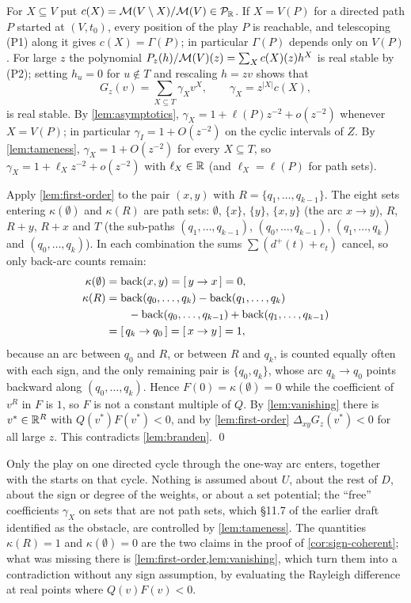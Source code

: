 For $X\subseteq V$ put $c(X)=\mathcal{M}(V\setminus X)/\mathcal{M}(V)\in\mathcal{P}_{\mathbb{R}}$. If $X=V(P)$ for a directed path $P$ started at $(V,t_0)$, every position of the play $P$ is reachable, and telescoping \textup{(P1)} along it gives $c(X)=\Gamma(P)$; in particular $\Gamma(P)$ depends only on $V(P)$. For large $z$ the polynomial $P_z(h)/\mathcal{M}(V)(z)=\sum_Xc(X)(z)h^X$ is real stable by \textup{(P2)}; setting $h_u=0$ for $u\notin T$ and rescaling $h=zv$ shows that
\[
G_z(v)=\sum_{X\subseteq T}\gamma_Xv^X,\qquad \gamma_X=z^{|X|}c(X),
\]
is real stable. By \cref{lem:asymptotics}, $\gamma_X=1+\ell(P)z^{-2}+o(z^{-2})$ whenever $X=V(P)$; in particular $\gamma_I=1+O(z^{-2})$ on the cyclic intervals of $Z$. By \cref{lem:tameness}, $\gamma_X=1+O(z^{-2})$ for every $X\subseteq T$, so $\gamma_X=1+\ell_Xz^{-2}+o(z^{-2})$ with $\ell_X\in\mathbb{R}$ (and $\ell_X=\ell(P)$ for path sets).

Apply \cref{lem:first-order} to the pair $(x,y)$ with $R=\{q_1,\dots,q_{k-1}\}$. The eight sets entering $\kappa(\emptyset)$ and $\kappa(R)$ are path sets: $\emptyset$, $\{x\}$, $\{y\}$, $\{x,y\}$ (the arc $x\to y$), $R$, $R+y$, $R+x$ and $T$ (the sub-paths $(q_1,\dots,q_{k-1})$, $(q_0,\dots,q_{k-1})$, $(q_1,\dots,q_k)$ and $(q_0,\dots,q_k)$). In each combination the sums $\sum(d^{+}(t)+e_t)$ cancel, so only back-arc counts remain:
\begin{align*}
\kappa(\emptyset)&=\operatorname{back}(x,y)=[\,y\to x\,]=0,\\
\kappa(R)&=\operatorname{back}(q_0,\dots,q_k)-\operatorname{back}(q_1,\dots,q_k)\\
&\qquad-\operatorname{back}(q_0,\dots,q_{k-1})+\operatorname{back}(q_1,\dots,q_{k-1})\\
&=[\,q_k\to q_0\,]=[\,x\to y\,]=1,
\end{align*}
because an arc between $q_0$ and $R$, or between $R$ and $q_k$, is counted equally often with each sign, and the only remaining pair is $\{q_0,q_k\}$, whose arc $q_k\to q_0$ points backward along $(q_0,\dots,q_k)$. Hence $F(0)=\kappa(\emptyset)=0$ while the coefficient of $v^R$ in $F$ is $1$, so $F$ is not a constant multiple of $Q$. By \cref{lem:vanishing} there is $v^{*}\in\mathbb{R}^R$ with $Q(v^{*})F(v^{*})<0$, and by \cref{lem:first-order} $\Delta_{xy}G_z(v^{*})<0$ for all large $z$. This contradicts \cref{lem:branden}. \qed

\begin{remark}\label{rem:locality}
Only the play on one directed cycle through the one-way arc enters, together with the starts on that cycle. Nothing is assumed about $U$, about the rest of $D$, about the sign or degree of the weights, or about a set potential; the ``free'' coefficients $\gamma_X$ on sets that are not path sets, which \S11.7 of the earlier draft identified as the obstacle, are controlled by \cref{lem:tameness}. The quantities $\kappa(R)=1$ and $\kappa(\emptyset)=0$ are the two claims in the proof of \cref{cor:sign-coherent}; what was missing there is \cref{lem:first-order,lem:vanishing}, which turn them into a contradiction without any sign assumption, by evaluating the Rayleigh difference at real points where $Q(v)F(v)<0$.
\end{remark}

